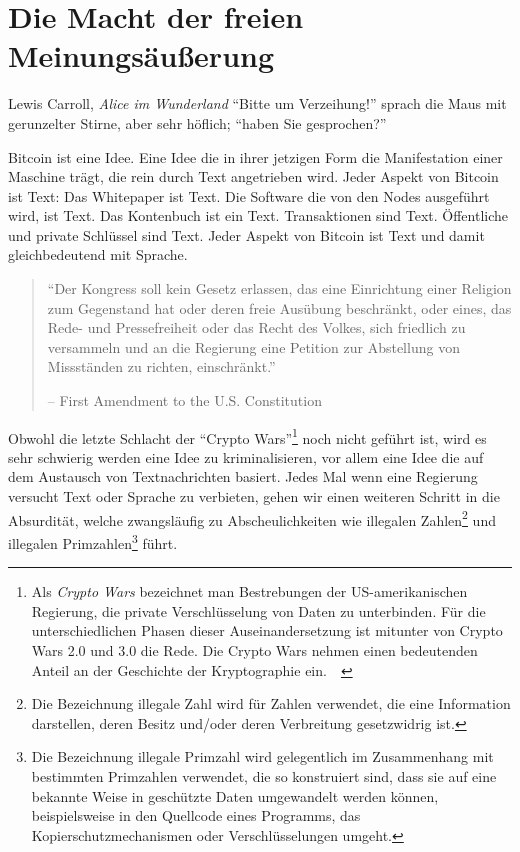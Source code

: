 \chapter{Die Macht der freien Meinungsäußerung}
\label{les:6}

\begin{chapquote}{Lewis Carroll, \textit{Alice im Wunderland}}
\enquote{Bitte um Verzeihung!} sprach die Maus mit gerunzelter Stirne,
aber sehr höflich; \enquote{haben Sie gesprochen?}
\end{chapquote}

Bitcoin ist eine Idee. Eine Idee die in ihrer jetzigen Form die Manifestation
einer Maschine trägt, die rein durch Text angetrieben wird. Jeder Aspekt von
Bitcoin ist Text: Das Whitepaper ist Text. Die Software die von den Nodes
ausgeführt wird, ist Text. Das Kontenbuch ist ein Text. Transaktionen sind Text.
Öffentliche und private Schlüssel sind Text. Jeder Aspekt von Bitcoin ist Text
und damit gleichbedeutend mit Sprache.

\begin{quotation}\begin{samepage}
\enquote{Der Kongress soll kein Gesetz erlassen, das eine Einrichtung einer
Religion zum Gegenstand hat oder deren freie Ausübung beschränkt, oder eines,
das Rede- und Pressefreiheit oder das Recht des Volkes, sich friedlich zu
versammeln und an die Regierung eine Petition zur Abstellung von Missständen zu
richten, einschränkt.}
\begin{flushright} -- First Amendment to the U.S. Constitution
\end{flushright}\end{samepage}\end{quotation}

Obwohl die letzte Schlacht der \enquote{Crypto Wars}\footnote{Als \textit{Crypto
Wars} bezeichnet man Bestrebungen der US-amerikanischen Regierung, die private
Verschlüsselung von Daten zu unterbinden. Für die unterschiedlichen Phasen
dieser Auseinandersetzung ist mitunter von Crypto Wars 2.0 und 3.0 die Rede. Die
Crypto Wars nehmen einen bedeutenden Anteil an der Geschichte der Kryptographie
ein.~\cite{eff-cryptowars}~\cite{wiki:cryptowars}} noch nicht geführt ist, wird
es sehr schwierig werden eine Idee zu kriminalisieren, vor allem eine Idee die
auf dem Austausch von Textnachrichten basiert. Jedes Mal wenn eine Regierung
versucht Text oder Sprache zu verbieten, gehen wir einen weiteren Schritt in die
Absurdität, welche zwangsläufig zu Abscheulichkeiten wie illegalen
Zahlen\footnote{Die Bezeichnung illegale Zahl wird für Zahlen verwendet, die
eine Information darstellen, deren Besitz und/oder deren Verbreitung
gesetzwidrig ist.\cite{wiki:illegal-number}} und illegalen
Primzahlen\footnote{Die Bezeichnung illegale Primzahl wird gelegentlich im
Zusammenhang mit bestimmten Primzahlen verwendet, die so konstruiert sind, dass
sie auf eine bekannte Weise in geschützte Daten umgewandelt werden können,
beispielsweise in den Quellcode eines Programms, das Kopierschutzmechanismen
oder Verschlüsselungen umgeht.\cite{wiki:illegal-prime}} führt.

